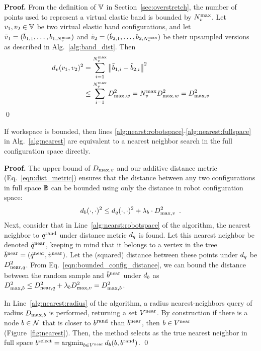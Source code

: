 \noindent
{\bf Proof.}
From the definition of $\mathbb{V}$ in Section~\ref{sec:overstretch}, the number of points used to represent a virtual elastic band is bounded by $N_v^\textrm{max}$. Let $v_1, v_2 \in \mathbb{V}$ be two virtual elastic band configurations, and let $\tilde {v}_1 = (\tilde b_{1,1}, \dots, b_{1,N_v^\textrm{max}})$ and $\tilde {v}_2 = (\tilde b_{2,1}, \dots, b_{2,N_v^\textrm{max}})$ be their upsampled versions as described in Alg.~\ref{alg:band_dist}. Then
\begin{equation}
\begin{split}
    d_v(v_1, v_2)^2 &= \sum_{i=1}^{N_v^\textrm{max}} \left\| \tilde b_{1,i} - \tilde b_{2,i} \right\|^2 \\
                                &\leq \sum_{i=1}^{N_v^\textrm{max}} D_{\textrm{max}, w}^2 = N_v^\textrm{max} D_{\textrm{max}, w}^2 = D_{\textrm{max},v}^2
\end{split}
\end{equation}
\qed

\begin{lemma}
    If workspace is bounded, then lines \ref{alg:nearst:robotspace}-\ref{alg:nearest:fullspace} in Alg.~\ref{alg:nearest} are equivalent to a nearest neighbor search in the full configuration space directly.
\end{lemma}

\noindent
{\bf Proof.}
The upper bound of $D_{\textrm{max},v}$ and our additive distance metric (Eq.~\eqref{eqn:dist_metric}) ensures that the distance between any two configurations in full space $\mathbb{B}$ can be bounded using only the distance in robot configuration space:
\begin{equation}
    d_b(\cdot,\cdot)^2 \leq d_q(\cdot,\cdot)^2 + \lambda_b \cdot D_{\textrm{max},v}^2 \enspace .
    \label{eqn:bounded_config_distance}
\end{equation}
Next, consider that in Line~\ref{alg:nearst:robotspace} of the algorithm, the nearest neighbor to $q^\textrm{rand}$ under distance metric $d_q$ is found.  Let this nearest neighbor be denoted $\tilde{q}^\textrm{near}$, keeping in mind that it belongs to a vertex in the tree $\tilde{b}^\textrm{near} = (\tilde{q}^\textrm{near}, \tilde{v}^\textrm{near})$.  Let the (squared) distance between these points under $d_q$ be $D_{\textrm{near},q}^2$.  From Eq.~\eqref{eqn:bounded_config_distance}, we can bound the distance between the random sample and $\tilde{b}^\textrm{near}$ under $d_b$ as $D_{\textrm{max},b}^2 \leq D_{\textrm{near},q}^2 + \lambda_b D_{\textrm{max},v}^2 = D_{\textrm{max},b}^2$.

In Line~\ref{alg:nearest:radius} of the algorithm, a radius nearest-neighbors query of radius $D_{\textrm{max},b}$ is performed, returning a set $V^{\textrm{near}}$.  By construction if there is a node $b \in \mathcal{N}$ that is closer to $b^\textrm{rand}$ than $\tilde{b}^\textrm{near}$, then $b \in V^{\textrm{near}}$ (Figure~\ref{fig:nearest}). Then, the method selects as the true nearest neighbor in full space $b^\textrm{select} = \operatorname*{argmin}_{b \in V^{\textrm{near}}}{d_b(b, b^\textrm{rand})}$.
\qed

